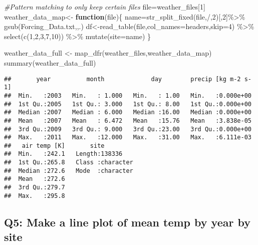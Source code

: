 \documentclass[
]{book}
\newenvironment{Shaded}{\begin{snugshade}}{\end{snugshade}}
\newcommand{\AttributeTok}[1]{\textcolor[rgb]{0.77,0.63,0.00}{#1}}
\newcommand{\CommentTok}[1]{\textcolor[rgb]{0.56,0.35,0.01}{\textit{#1}}}
\newcommand{\ControlFlowTok}[1]{\textcolor[rgb]{0.13,0.29,0.53}{\textbf{#1}}}
\newcommand{\DecValTok}[1]{\textcolor[rgb]{0.00,0.00,0.81}{#1}}
\newcommand{\FunctionTok}[1]{\textcolor[rgb]{0.00,0.00,0.00}{#1}}
\newcommand{\NormalTok}[1]{#1}
\newcommand{\OtherTok}[1]{\textcolor[rgb]{0.56,0.35,0.01}{#1}}
\newcommand{\SpecialCharTok}[1]{\textcolor[rgb]{0.00,0.00,0.00}{#1}}
\newcommand{\StringTok}[1]{\textcolor[rgb]{0.31,0.60,0.02}{#1}}
\begin{document}
\begin{Shaded}
\begin{Highlighting}[]
\CommentTok{\#Pattern matching to only keep certain files}
\NormalTok{file}\OtherTok{=}\NormalTok{weather\_files[}\DecValTok{1}\NormalTok{]}
\NormalTok{weather\_data\_map}\OtherTok{\textless{}{-}} \ControlFlowTok{function}\NormalTok{(file)\{}
\NormalTok{  name}\OtherTok{=}\FunctionTok{str\_split\_fixed}\NormalTok{(file,}\StringTok{\textquotesingle{}/\textquotesingle{}}\NormalTok{,}\DecValTok{2}\NormalTok{)[,}\DecValTok{2}\NormalTok{]}\SpecialCharTok{\%\textgreater{}\%}
    \FunctionTok{gsub}\NormalTok{(}\StringTok{\textquotesingle{}Forcing\_Data.txt\textquotesingle{}}\NormalTok{,}\StringTok{\textquotesingle{}\textquotesingle{}}\NormalTok{,.)}
\NormalTok{  df}\OtherTok{\textless{}{-}}\FunctionTok{read\_table}\NormalTok{(file,}\AttributeTok{col\_names=}\NormalTok{headers,}\AttributeTok{skip=}\DecValTok{4}\NormalTok{) }\SpecialCharTok{\%\textgreater{}\%} 
    \FunctionTok{select}\NormalTok{(}\FunctionTok{c}\NormalTok{(}\DecValTok{1}\NormalTok{,}\DecValTok{2}\NormalTok{,}\DecValTok{3}\NormalTok{,}\DecValTok{7}\NormalTok{,}\DecValTok{10}\NormalTok{)) }\SpecialCharTok{\%\textgreater{}\%}
    \FunctionTok{mutate}\NormalTok{(}\AttributeTok{site=}\NormalTok{name)}
\NormalTok{\}}

\NormalTok{weather\_data\_full }\OtherTok{\textless{}{-}} \FunctionTok{map\_dfr}\NormalTok{(weather\_files,weather\_data\_map)}
\FunctionTok{summary}\NormalTok{(weather\_data\_full)}
\end{Highlighting}
\end{Shaded}

\begin{verbatim}
##       year          month             day        precip [kg m-2 s-1]
##  Min.   :2003   Min.   : 1.000   Min.   : 1.00   Min.   :0.000e+00  
##  1st Qu.:2005   1st Qu.: 3.000   1st Qu.: 8.00   1st Qu.:0.000e+00  
##  Median :2007   Median : 6.000   Median :16.00   Median :0.000e+00  
##  Mean   :2007   Mean   : 6.472   Mean   :15.76   Mean   :3.838e-05  
##  3rd Qu.:2009   3rd Qu.: 9.000   3rd Qu.:23.00   3rd Qu.:0.000e+00  
##  Max.   :2011   Max.   :12.000   Max.   :31.00   Max.   :6.111e-03  
##   air temp [K]       site          
##  Min.   :242.1   Length:138336     
##  1st Qu.:265.8   Class :character  
##  Median :272.6   Mode  :character  
##  Mean   :272.6                     
##  3rd Qu.:279.7                     
##  Max.   :295.8
\end{verbatim}

\hypertarget{q5-make-a-line-plot-of-mean-temp-by-year-by-site}{%
\subsection{Q5: Make a line plot of mean temp by year by site}\label{q5-make-a-line-plot-of-mean-temp-by-year-by-site}}
\end{document}
